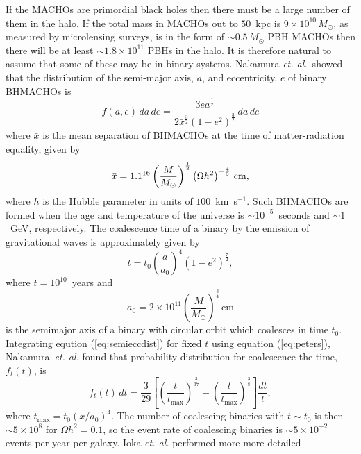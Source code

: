 If the MACHOs are primordial black holes then there must be a large number of
them in the halo. If the total mass in MACHOs out to $50$~kpc is $9\times
10^{10}\,M_\odot$, as measured by microlensing surveys, is in the form of
$\sim 0.5\, M_\odot$ PBH MACHOs then there will be at least $\sim 1.8 \times
10^{11}$ PBHs in the halo. It is therefore natural to assume that some of
these may be in binary systems. Nakamura \emph{et. al.}~showed that the
distribution of the semi-major axis, $a$, and eccentricity, $e$ of binary
BHMACHOs is
\begin{equation}
f(a,e)\, da\, de = 
\frac{ 3ea^{\frac{1}{2}} }
{ 2\bar{x}^{\frac{3}{2}} (1-e^2)^{\frac{3}{2}}  } \, da\, de 
\end{equation}
where $\bar{x}$ is the mean separation of BHMACHOs at the time of
matter-radiation equality, given by
\begin{equation}
\bar{x} = 1.1 \time 10^{16} \left(\frac{M}{M_\odot}\right)^{\frac{1}{3}}
\left(\Omega h^2\right)^{-\frac{4}{3}} \,\mathrm{cm},
\end{equation}
where $h$ is the Hubble parameter in units of $100$~km~s$^{-1}$. Such BHMACHOs 
are formed when the age and temperature of the universe is $\sim
10^{-5}$~seconds and $\sim 1$~GeV, respectively. The coalescence time of a
binary by the emission of gravitational waves is approximately given by
\cite{Peters:1964}
\begin{equation}
t = t_0 \left(\frac{a}{a_0}\right)^4 \left(1 - e^2\right)^{\frac{7}{2}},
\label{eq:peters}
\end{equation}
where $t = 10^10$~years and
\begin{equation}
a_0 = 2 \times 10^{11}
\left(\frac{M}{M_\odot}\right)^{\frac{3}{4}}\,\mathrm{cm}
\end{equation}
is the semimajor axis of a binary with circular orbit which coalesces in time
$t_0$. Integrating eqution (\ref{eq:semieccdist}) for fixed $t$ using equation
(\ref{eq:peters}), Nakamura~\emph{et. al.} found that probability distribution
for coalescence the time, $f_t(t)$, is
\begin{equation}
f_t(t)\,dt = \frac{3}{29}\left[
\left(\frac{t}{t_\mathrm{max}}\right)^{\frac{3}{37}} -
\left(\frac{t}{t_\mathrm{max}}\right)^{\frac{3}{8}}\right] \frac{dt}{t},
\end{equation}
where $t_\mathrm{max} = t_0(\bar{x}/a_0)^4$. The number of coalescing
binaries with $t \sim t_0$ is then $\sim 5 \times 10^{8}$ for $\Omega h^2 =
0.1$, so the event rate of coalescing binaries is $\sim 5 \times 10^{-2}$
events per year per galaxy. Ioka \emph{et. al.} performed more more detailed
